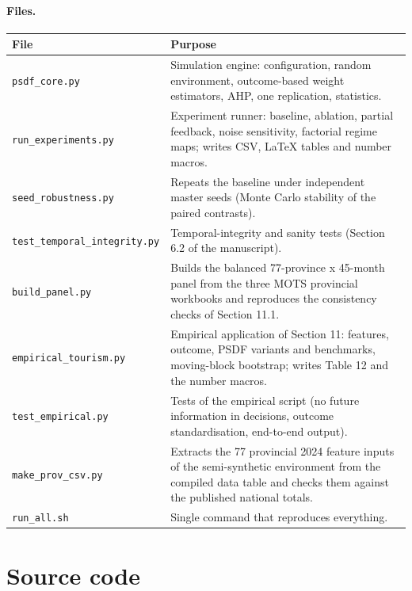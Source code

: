 \documentclass[10pt,a4paper]{article}
\begin{document}
\paragraph{Files.}
\begin{tabular}{ll}
\toprule File & Purpose\\\midrule
\texttt{psdf\_core.py} & Simulation engine: configuration, random environment, outcome-based weight estimators, AHP, one replication, statistics.\\
\texttt{run\_experiments.py} & Experiment runner: baseline, ablation, partial feedback, noise sensitivity, factorial regime maps; writes CSV, LaTeX tables and number macros.\\
\texttt{seed\_robustness.py} & Repeats the baseline under independent master seeds (Monte Carlo stability of the paired contrasts).\\
\texttt{test\_temporal\_integrity.py} & Temporal-integrity and sanity tests (Section 6.2 of the manuscript).\\
\texttt{build\_panel.py} & Builds the balanced 77-province x 45-month panel from the three MOTS provincial workbooks and reproduces the consistency checks of Section 11.1.\\
\texttt{empirical\_tourism.py} & Empirical application of Section 11: features, outcome, PSDF variants and benchmarks, moving-block bootstrap; writes Table 12 and the number macros.\\
\texttt{test\_empirical.py} & Tests of the empirical script (no future information in decisions, outcome standardisation, end-to-end output).\\
\texttt{make\_prov\_csv.py} & Extracts the 77 provincial 2024 feature inputs of the semi-synthetic environment from the compiled data table and checks them against the published national totals.\\
\texttt{run\_all.sh} & Single command that reproduces everything.\\
\bottomrule\end{tabular}

\section{Source code}
\end{document}
